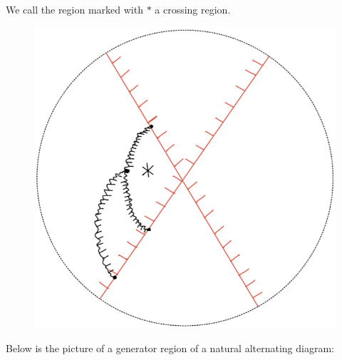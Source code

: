 \begin{definition}
\begin{enumerate}[label = (\roman*)]
\begin{figure}[H]
    \caption{}
    \label{fig:your-label}
\end{figure}
We call the region marked with $*$ a crossing region.
\begin{figure}[H] 
    \centering
    \includegraphics[scale = 0.95]{diagrams/local_systems_on_as_diagrams/11.png} 
    \caption{}
    \label{fig:your-label}
\end{figure}
\end{enumerate}

Below is the picture of a generator region of a natural alternating diagram:


\end{definition}
